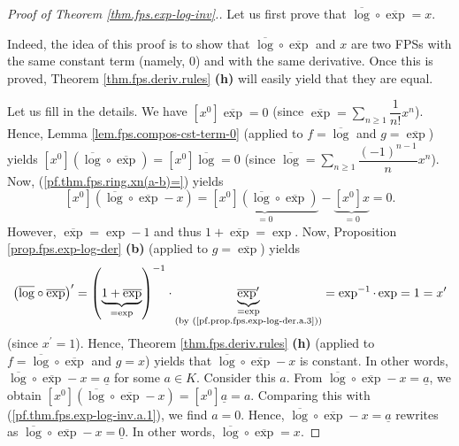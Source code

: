\begin{proof}
[Proof of Theorem \ref{thm.fps.exp-log-inv}.]Let us first prove that
$\overline{\log}\circ\overline{\exp}=x$.

Indeed, the idea of this proof is to show that $\overline{\log}\circ
\overline{\exp}$ and $x$ are two FPSs with the same constant term (namely,
$0$) and with the same derivative. Once this is proved, Theorem
\ref{thm.fps.deriv.rules} \textbf{(h)} will easily yield that they are equal.

Let us fill in the details. We have $\left[  x^{0}\right]  \overline{\exp}=0$
(since $\overline{\exp}=\sum_{n\geq1}\dfrac{1}{n!}x^{n}$). Hence, Lemma
\ref{lem.fps.compos-cst-term-0} (applied to $f=\overline{\log}$ and
$g=\overline{\exp}$) yields $\left[  x^{0}\right]  \left(  \overline{\log
}\circ\overline{\exp}\right)  =\left[  x^{0}\right]  \overline{\log}=0$ (since
$\overline{\log}=\sum_{n\geq1}\dfrac{\left(  -1\right)  ^{n-1}}{n}x^{n}$).
Now, (\ref{pf.thm.fps.ring.xn(a-b)=}) yields%
\begin{equation}
\left[  x^{0}\right]  \left(  \overline{\log}\circ\overline{\exp}-x\right)
=\underbrace{\left[  x^{0}\right]  \left(  \overline{\log}\circ\overline{\exp
}\right)  }_{=0}-\underbrace{\left[  x^{0}\right]  x}_{=0}=0.
\label{pf.thm.fps.exp-log-inv.a.1}%
\end{equation}
However, $\overline{\exp}=\exp-1$ and thus $1+\overline{\exp}=\exp$. Now,
Proposition \ref{prop.fps.exp-log-der} \textbf{(b)} (applied to $g=\overline
{\exp}$) yields
\[
\left(  \overline{\log}\circ\overline{\exp}\right)  ^{\prime}=\left(
\underbrace{1+\overline{\exp}}_{=\exp}\right)  ^{-1}\cdot\underbrace{\overline
{\exp}^{\prime}}_{\substack{=\exp\\\text{(by
(\ref{pf.prop.fps.exp-log-der.a.3}))}}}=\exp^{-1}\cdot\exp=1=x^{\prime}%
\]
(since $x^{\prime}=1$). Hence, Theorem \ref{thm.fps.deriv.rules} \textbf{(h)}
(applied to $f=\overline{\log}\circ\overline{\exp}$ and $g=x$) yields that
$\overline{\log}\circ\overline{\exp}-x$ is constant. In other words,
$\overline{\log}\circ\overline{\exp}-x=\underline{a}$ for some $a\in K$.
Consider this $a$. From $\overline{\log}\circ\overline{\exp}-x=\underline{a}$,
we obtain $\left[  x^{0}\right]  \left(  \overline{\log}\circ\overline{\exp
}-x\right)  =\left[  x^{0}\right]  \underline{a}=a$. Comparing this with
(\ref{pf.thm.fps.exp-log-inv.a.1}), we find $a=0$. Hence, $\overline{\log
}\circ\overline{\exp}-x=\underline{a}$ rewrites as $\overline{\log}%
\circ\overline{\exp}-x=\underline{0}$. In other words, $\overline{\log}%
\circ\overline{\exp}=x$.


\end{proof}
